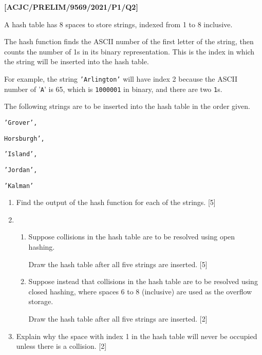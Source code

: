 \item \textbf{{[}ACJC/PRELIM/9569/2021/P1/Q2{]} }

A hash table has 8 spaces to store strings, indexed from 1 to 8 inclusive.

The hash function finds the ASCII number of the first letter of the
string, then counts the number of 1s in its binary representation.
This is the index in which the string will be inserted into the hash
table.

For example, the string \texttt{'Arlington'} will have index 2 because
the ASCII number of '\texttt{A}' is 65, which is \texttt{1000001}
in binary, and there are two \texttt{1}s.

The following strings are to be inserted into the hash table in the
order given.

\texttt{'Grover', }

\texttt{Horsburgh', }

\texttt{'Island',}

\texttt{'Jordan', }

\texttt{'Kalman'}
\begin{enumerate}
\item Find the output of the hash function for each of the strings. \hfill{}{[}5{]}
\item {}
\begin{enumerate}
\item Suppose collisions in the hash table are to be resolved using open
hashing.

Draw the hash table after all five strings are inserted. \hfill{}{[}5{]}
\item Suppose instead that collisions in the hash table are to be resolved
using closed hashing, where spaces 6 to 8 (inclusive) are used as
the overflow storage.

Draw the hash table after all five strings are inserted. \hfill{}
{[}2{]}
\end{enumerate}
\item Explain why the space with index 1 in the hash table will never be
occupied unless there is a collision. \hfill{} {[}2{]}
\end{enumerate}